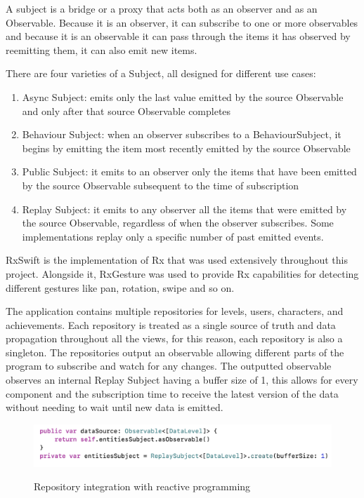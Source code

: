 \documentclass[12 pct]{report}
\begin{document}
A subject is a bridge or a proxy that acts both as an observer and as an Observable. Because it is an observer, it can subscribe to one or more observables and because it is an observable it can pass through the items it has observed by reemitting them, it can also emit new items.

There are four varieties of a Subject, all designed for different use cases:
\begin{enumerate}
\item Async Subject: emits only the last value emitted by the source Observable and only after that source Observable completes
\item Behaviour Subject: when an observer subscribes to a BehaviourSubject, it begins by emitting the item most recently emitted by the source Observable
\item Public Subject: it emits to an observer only the items that have been emitted by the source Observable subsequent to the time of subscription
\item Replay Subject: it emits to any observer all the items that were emitted by the source Observable, regardless of when the observer subscribes. Some implementations replay only a specific number of past emitted events.
\end{enumerate}

RxSwift \cite{pillet2017rxswift} is the implementation of Rx that was used extensively throughout this project. Alongside it, RxGesture was used to provide Rx capabilities for detecting different gestures like pan, rotation, swipe and so on.

The application contains multiple repositories for levels, users, characters, and achievements. Each repository is treated as a single source of truth and data propagation throughout all the views, for this reason, each repository is also a singleton. The repositories output an observable allowing different parts of the program to subscribe and watch for any changes. The outputted observable observes an internal Replay Subject having a buffer size of 1, this allows for every component and the subscription time to receive the latest version of the data without needing to wait until new data is emitted.

\begin{figure}[H]
\includegraphics[width=1.0\textwidth]{reactive-repository}
\centering
\label{fig:reactive-repository}
\caption{Repository integration with reactive programming }
\end{figure}
\end{document}
